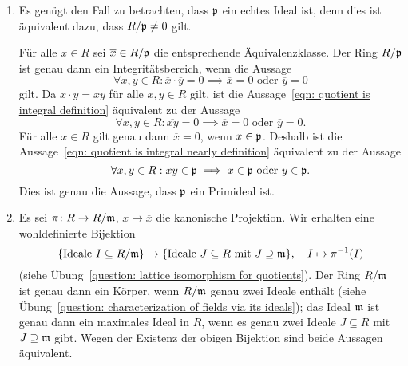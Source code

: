 \begin{solution}
  \begin{enumerate}
    \item
      Es genügt den Fall zu betrachten, dass $\mathfrak{p}$ ein echtes Ideal ist, denn dies ist äquivalent dazu, dass $R/\mathfrak{p} \neq 0$ gilt.
      
      Für alle $x \in R$ sei $\overline{x} \in R/\mathfrak{p}$ die entsprechende Äquivalenzklasse.
      Der Ring $R/\mathfrak{p}$ ist genau dann ein Integritätsbereich, wenn die Aussage
      \begin{equation}
        \label{eqn: quotient is integral definition}
        \forall x, y \in R
        :
        \overline{x} \cdot \overline{y} = 0
        \implies
        \text{$\overline{x} = 0$ oder $\overline{y} = 0$}
      \end{equation}
      gilt. Da $\overline{x} \cdot \overline{y} = \overline{xy}$ für alle $x, y \in R$ gilt, ist die Aussage~\eqref{eqn: quotient is integral definition} äquivalent zu der Aussage
      \begin{equation}
        \label{eqn: quotient is integral nearly definition}
        \forall x, y \in R
        :
        \overline{xy} = 0
        \implies
        \text{$\overline{x} = 0$ oder $\overline{y} = 0$}.
      \end{equation}
      Für alle $x \in R$ gilt genau dann $\overline{x} = 0$, wenn $x \in \mathfrak{p}$.
      Deshalb ist die Aussage~\eqref{eqn: quotient is integral nearly definition} äquivalent zu der Aussage
      \begin{equation}
        \label{eqn: quotient is integral via prime }
        \forall x, y \in R
        :
        xy \in \mathfrak{p}
        \implies
        \text{$x \in \mathfrak{p}$ oder $y \in \mathfrak{p}$}.
      \end{equation}
      Dies ist genau die Aussage, dass $\mathfrak{p}$ ein Primideal ist.
      
    \item
      Es sei $\pi \colon R \to R/\mathfrak{m}$, $x \mapsto \overline{x}$ die kanonische Projektion.
      Wir erhalten eine wohldefinierte Bijektion
      \[
            \{ \text{Ideale $I \subseteq R/\mathfrak{m}$} \}
        \to \{ \text{Ideale $J \subseteq R$ mit $J \supseteq \mathfrak{m}$} \},
        \quad
        I \mapsto \pi^{-1}(I)
      \]
      (siehe Übung~\ref{question: lattice isomorphism for quotients}).
      Der Ring $R/\mathfrak{m}$ ist genau dann ein Körper, wenn $R/\mathfrak{m}$ genau zwei Ideale enthält (siehe Übung~\ref{question: characterization of fields via its ideals}); das Ideal $\mathfrak{m}$ ist genau dann ein maximales Ideal in $R$, wenn es genau zwei Ideale $J \subseteq R$ mit $J \supseteq \mathfrak{m}$ gibt.
      Wegen der Existenz der obigen Bijektion sind beide Aussagen äquivalent.
  \end{enumerate}
\end{solution}


